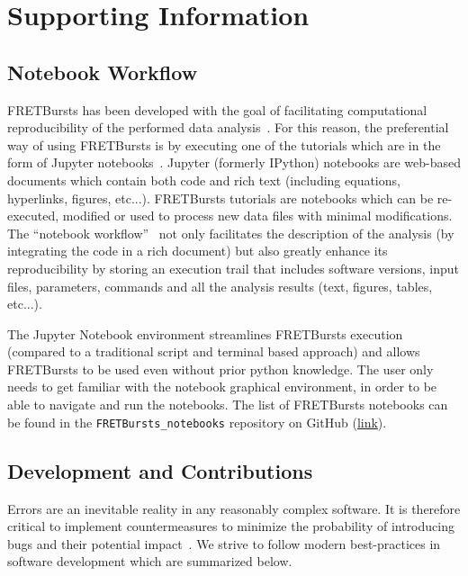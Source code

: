 \section{Supporting Information}

\subsection{Notebook Workflow}
\label{sec:notebook}

FRETBursts has been developed with the goal of facilitating computational reproducibility
of the performed data analysis~\cite{Buckheit_1995}. For this reason,
the preferential way of using FRETBursts is by executing one of the tutorials
which are in the form of Jupyter notebooks~\cite{Shen_2014}.
Jupyter (formerly IPython) notebooks are web-based documents which contain both
code and rich text (including equations, hyperlinks, figures, etc...).
FRETBursts tutorials are notebooks which can be re-executed,
modified or used to process new data files with minimal modifications.
The ``notebook workflow''~\cite{Shen_2014} not only facilitates
the description of the analysis (by integrating the code in a rich document)
but also greatly enhance its reproducibility by storing an execution trail
that includes software versions, input files, parameters, commands and all
the analysis results (text, figures, tables, etc...).

The Jupyter Notebook environment streamlines FRETBursts execution (compared to
a traditional script and terminal based approach) and allows
FRETBursts to be used even without prior python knowledge.
The user only needs to get familiar with the
notebook graphical environment, in order to be able to navigate and run the notebooks.
The list of FRETBursts notebooks can be found in the
\verb|FRETBursts_notebooks| repository on GitHub
(\href{https://github.com/tritemio/FRETBursts_notebooks}{link}).


\subsection{Development and Contributions}
\label{sec:dev}
Errors are an inevitable reality in any reasonably complex software. It is 
therefore critical to implement countermeasures to
minimize the probability of introducing bugs and their potential impact~\cite{Prli__2012, Wilson_2014}.
We strive to follow modern best-practices in software development which are summarized 
below.

